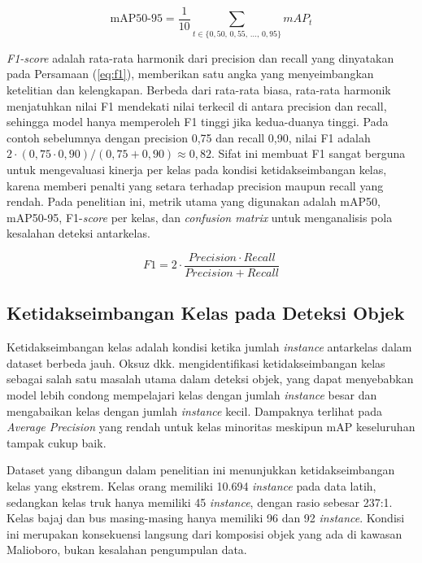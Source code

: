\begin{equation}
    \text{mAP50-95} = \frac{1}{10} \sum_{t \in \{0{,}50,\, 0{,}55,\, \dots,\, 0{,}95\}} \mathit{mAP}_{t}
    \label{eq:map5095}
\end{equation}

\textit{F1-score} adalah rata-rata harmonik dari precision dan recall yang dinyatakan pada 
Persamaan (\ref{eq:f1}), memberikan satu angka yang menyeimbangkan ketelitian dan 
kelengkapan. Berbeda dari rata-rata biasa, rata-rata harmonik menjatuhkan nilai F1 mendekati 
nilai terkecil di antara precision dan recall, sehingga model hanya memperoleh F1 tinggi 
jika kedua-duanya tinggi. Pada contoh sebelumnya dengan precision 0,75 dan recall 0,90, 
nilai F1 adalah $2 \cdot (0,75 \cdot 0,90)/(0,75 + 0,90) \approx 0,82$. Sifat ini membuat F1 
sangat berguna untuk mengevaluasi kinerja per kelas pada kondisi ketidakseimbangan kelas, 
karena memberi penalti yang setara terhadap precision maupun recall yang rendah. Pada 
penelitian ini, metrik utama yang digunakan adalah mAP50, mAP50-95, F1-\textit{score} per 
kelas, dan \textit{confusion matrix} untuk menganalisis pola kesalahan deteksi antarkelas.

\begin{equation}
    \mathit{F1} = 2 \cdot \frac{\mathit{Precision} \cdot \mathit{Recall}}{\mathit{Precision} + \mathit{Recall}}
    \label{eq:f1}
\end{equation}

\subsection{Ketidakseimbangan Kelas pada Deteksi Objek}
\label{sec:ketidakseimbangan}

Ketidakseimbangan kelas adalah kondisi ketika jumlah \textit{instance} antarkelas dalam 
dataset berbeda jauh. Oksuz dkk. \cite{oksuz2021imbalance} mengidentifikasi 
ketidakseimbangan kelas sebagai salah satu masalah utama dalam deteksi objek, yang dapat 
menyebabkan model lebih condong mempelajari kelas dengan jumlah \textit{instance} besar 
dan mengabaikan kelas dengan jumlah \textit{instance} kecil. Dampaknya terlihat pada 
\textit{Average Precision} yang rendah untuk kelas minoritas meskipun mAP keseluruhan 
tampak cukup baik.

Dataset yang dibangun dalam penelitian ini menunjukkan ketidakseimbangan kelas yang 
ekstrem. Kelas orang memiliki 10.694 \textit{instance} pada data latih, sedangkan kelas 
truk hanya memiliki 45 \textit{instance}, dengan rasio sebesar 237:1. Kelas bajaj dan bus 
masing-masing hanya memiliki 96 dan 92 \textit{instance}. Kondisi ini merupakan 
konsekuensi langsung dari komposisi objek yang ada di kawasan Malioboro, bukan kesalahan 
pengumpulan data.

